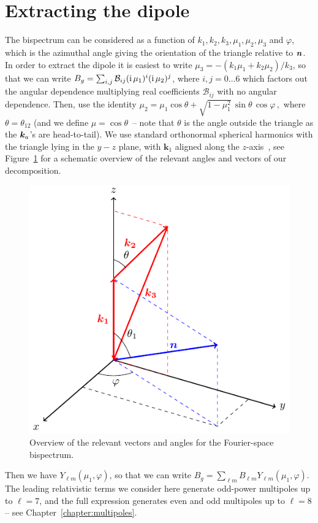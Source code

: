 \section{Extracting the dipole}

The bispectrum can be considered as a function of
$k_1,k_2,k_3,\mu_1, \mu_2,\mu_3$ and $\varphi$, which is the azimuthal angle giving the orientation of the triangle  relative to $\bm {n}$. In order to extract the dipole it is easiest to write $\mu_3=-(k_1\mu_1+k_2\mu_2)/k_3$, so that we can write $B_g = \sum_{i,j} \mathcal{B}_{ij}(\mathrm{i\,}\mu_1)^i(\mathrm{i\,}\mu_2)^j$, where $i,j=0\ldots6$ which factors out the angular dependence multiplying real coefficients $\mathcal{B}_{ij}$ with no angular dependence. Then,
 use the identity 
$%
\mu_2=\mu_1\cos\theta+\sqrt{1-\mu_1^2}\,\sin\theta\,\cos\varphi\,,
$ %
where $\theta=\theta_{12}$ (and we define $\mu=\cos\theta$~-- note that $\theta$ is the angle outside the triangle as the $\bm {k}_a$'s are head-to-tail). We use standard orthonormal spherical harmonics with the triangle lying in the $y-z$ plane, with $\bm k_1$ aligned along the $z$-axis~\citep{Nan:2017oaq}, see Figure~\ref{fig:geometry_overview1} for a schematic overview of the relevant angles and vectors of our decomposition.
\begin{figure}[ht]
    \centering
    \includegraphics[width=0.6\linewidth]{fig/fig.pdf}
    \caption{Overview of the relevant vectors and angles for the Fourier-space bispectrum. \label{fig:geometry_overview1} }
\end{figure}       
Then we have $Y_{\ell m}(\mu_1,\varphi)$, so that we can write $B_g =\sum_{\ell m} B_{\ell m}Y_{\ell m}(\mu_1,\varphi)$. The leading relativistic terms we consider here generate odd-power multipoles up to $\ell=7$, and the full expression generates even and odd multipoles up to $\ell=8$-- see Chapter~\ref{chapter:multipoles}. 
